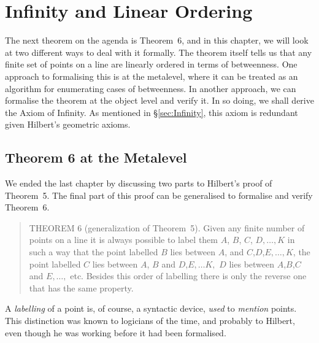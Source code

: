 \chapter{Infinity and Linear Ordering}\label{chapter:LinearOrder}
The next theorem on the agenda is Theorem~6, and in this chapter, we will look at two different ways to deal with it formally. The theorem itself tells us that any finite set of points on a line are linearly ordered in terms of betweenness. One approach to formalising this is at the metalevel, where it can be treated as an algorithm for enumerating cases of betweenness. In another approach, we can formalise the theorem at the object level and verify it. In so doing, we shall derive the Axiom of Infinity. As mentioned in \S\ref{sec:Infinity}, this axiom is redundant given Hilbert's geometric axioms.

\section{Theorem 6 at the Metalevel}\label{sec:Theorem6}
We ended the last chapter by discussing two parts to Hilbert's proof of Theorem~5. The final part of this proof can be generalised to formalise and verify Theorem~6.

\begin{quote}THEOREM 6 (generalization of Theorem~5). Given any finite number of points on a line it is always possible to label them $A$, $B$, $C$, $D, \ldots, K$ in such a way that the point labelled $B$ lies between $A$, and $C$,$D$,$E, \ldots, K$, the point labelled $C$ lies between $A$, $B$ and $D$,$E,\ldots K,$ $D$ lies between $A$,$B$,$C$ and $E, \ldots,$ etc. Besides this order of labelling there is only the reverse one that has the same property.
\end{quote}

A \emph{labelling} of a point is, of course, a syntactic device, \emph{used} to \emph{mention} points. This distinction was known to logicians of the time, and probably to Hilbert, even though he was working before it had been formalised.

